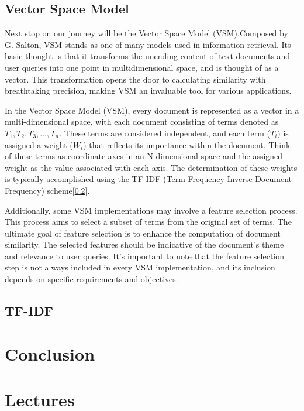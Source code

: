 \documentclass[10pt,english,a4paper]{article}
\begin{document}
\subsection{Vector Space Model}\label{vsm}
Next stop on our journey will be the Vector Space Model (VSM).Composed by G. Salton, VSM stands as one of many models used in information retrieval. Its basic thought is that it transforms the unending content of text documents and user queries into one point in multidimensional space, and is thought of as a vector\cite{VSM_explanation_article}. This transformation opens the door to calculating similarity with breathtaking precision, making VSM an invaluable tool for various applications. 

In the Vector Space Model (VSM), every document is represented as a vector in a multi-dimensional space, with each document consisting of terms denoted as $T_1, T_2, T_3, \ldots, T_n$. These terms are considered independent, and each term ($T_i$) is assigned a weight ($W_i$) that reflects its importance within the document. Think of these terms as coordinate axes in an N-dimensional space and the assigned weight as the value associated with each axis\cite{VSM_weight_terms_article}. The determination of these weights is typically accomplished using the TF-IDF (Term Frequency-Inverse Document Frequency) scheme[\ref{tf-idf}].

Additionally, some VSM implementations may involve a feature selection process. This process aims to select a subset of terms from the original set of terms. The ultimate goal of feature selection is to enhance the computation of document similarity. The selected features should be indicative of the document's theme and relevance to user queries\cite{VSM_weight_terms_article}.
It's important to note that the feature selection step is not always included in every VSM implementation, and its inclusion depends on specific requirements and objectives.
\subsection{TF-IDF}\label{tf-idf}
\section{Conclusion}
\section{Lectures}
 

\end{document}
